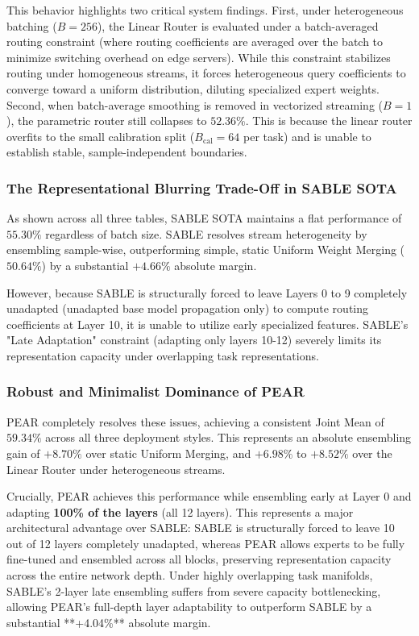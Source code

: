 This behavior highlights two critical system findings. First, under heterogeneous batching ($B=256$), the Linear Router is evaluated under a batch-averaged routing constraint (where routing coefficients are averaged over the batch to minimize switching overhead on edge servers). While this constraint stabilizes routing under homogeneous streams, it forces heterogeneous query coefficients to converge toward a uniform distribution, diluting specialized expert weights. Second, when batch-average smoothing is removed in vectorized streaming ($B=1$), the parametric router still collapses to $52.36\%$. This is because the linear router overfits to the small calibration split ($B_{\text{cal}} = 64$ per task) and is unable to establish stable, sample-independent boundaries.

\subsubsection{The Representational Blurring Trade-Off in SABLE SOTA}
As shown across all three tables, SABLE SOTA maintains a flat performance of $55.30\%$ regardless of batch size. SABLE resolves stream heterogeneity by ensembling sample-wise, outperforming simple, static Uniform Weight Merging ($50.64\%$) by a substantial $+4.66\%$ absolute margin. 

However, because SABLE is structurally forced to leave Layers 0 to 9 completely unadapted (unadapted base model propagation only) to compute routing coefficients at Layer 10, it is unable to utilize early specialized features. SABLE's "Late Adaptation" constraint (adapting only layers 10-12) severely limits its representation capacity under overlapping task representations.

\subsubsection{Robust and Minimalist Dominance of PEAR}
PEAR completely resolves these issues, achieving a consistent Joint Mean of $\mathbf{59.34\%}$ across all three deployment styles. This represents an absolute ensembling gain of $\mathbf{+8.70\%}$ over static Uniform Merging, and $\mathbf{+6.98\%}$ to $\mathbf{+8.52\%}$ over the Linear Router under heterogeneous streams. 

Crucially, PEAR achieves this performance while ensembling early at Layer 0 and adapting \textbf{100\% of the layers} (all 12 layers). This represents a major architectural advantage over SABLE: SABLE is structurally forced to leave 10 out of 12 layers completely unadapted, whereas PEAR allows experts to be fully fine-tuned and ensembled across all blocks, preserving representation capacity across the entire network depth. Under highly overlapping task manifolds, SABLE's 2-layer late ensembling suffers from severe capacity bottlenecking, allowing PEAR's full-depth layer adaptability to outperform SABLE by a substantial **+4.04\%** absolute margin.

